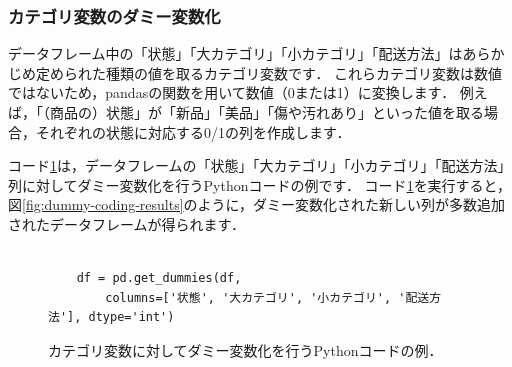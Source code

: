 \subsubsection*{カテゴリ変数のダミー変数化}

データフレーム中の「状態」「大カテゴリ」「小カテゴリ」「配送方法」はあらかじめ定められた種類の値を取るカテゴリ変数です．
これらカテゴリ変数は数値ではないため，pandasの関数を用いて数値（0または1）に変換します．
例えば，「（商品の）状態」が「新品」「美品」「傷や汚れあり」といった値を取る場合，それぞれの状態に対応する0/1の列を作成します．


コード\ref{code:dummy-coding}は，データフレームの「状態」「大カテゴリ」「小カテゴリ」「配送方法」列に対してダミー変数化を行うPythonコードの例です．
コード\ref{code:dummy-coding}を実行すると，図\ref{fig:dummy-coding-results}のように，ダミー変数化された新しい列が多数追加されたデータフレームが得られます．
\begin{figure}[!htbp]
    \begin{verbatim}

    df = pd.get_dummies(df,
        columns=['状態', '大カテゴリ', '小カテゴリ', '配送方法'], dtype='int')

    \end{verbatim}
    \captionsetup{name=コード}
    \caption{カテゴリ変数に対してダミー変数化を行うPythonコードの例．}
    \label{code:dummy-coding}
\end{figure}


